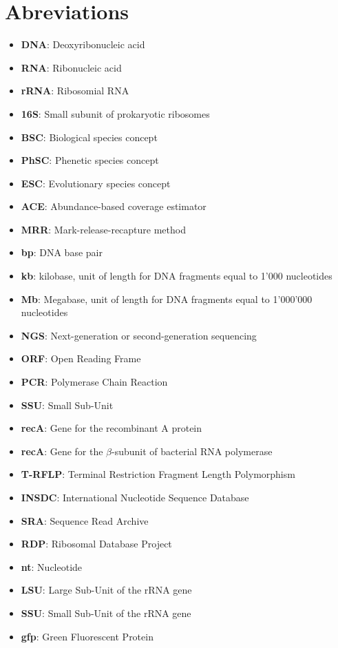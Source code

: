 \logvartrue
\chapter{Abreviations}

\begin{itemize}
\item \textbf{DNA}: Deoxyribonucleic acid
\item \textbf{RNA}: Ribonucleic acid
\item \textbf{rRNA}: Ribosomial RNA
\item \textbf{16S}: Small subunit of prokaryotic ribosomes
\item \textbf{BSC}: Biological species concept
\item \textbf{PhSC}: Phenetic species concept
\item \textbf{ESC}: Evolutionary species concept
\item \textbf{ACE}: Abundance-based coverage estimator
\item \textbf{MRR}: Mark-release-recapture method
\item \textbf{bp}: DNA base pair
\item \textbf{kb}: kilobase, unit of length for DNA fragments equal to 1'000 nucleotides
\item \textbf{Mb}: Megabase, unit of length for DNA fragments equal to 1'000'000 nucleotides
\item \textbf{NGS}: Next-generation or second-generation sequencing
\item \textbf{ORF}: Open Reading Frame
\item \textbf{PCR}: Polymerase Chain Reaction
\item \textbf{SSU}: Small Sub-Unit
\item \textbf{recA}: Gene for the recombinant A protein
\item \textbf{recA}: Gene for the $\beta$-subunit of bacterial RNA polymerase
\item \textbf{T-RFLP}: Terminal Restriction Fragment Length Polymorphism
\item \textbf{INSDC}: International Nucleotide Sequence Database
\item \textbf{SRA}: Sequence Read Archive
\item \textbf{RDP}: Ribosomal Database Project
\item \textbf{nt}: Nucleotide
\item \textbf{LSU}: Large Sub-Unit of the rRNA gene
\item \textbf{SSU}: Small Sub-Unit of the rRNA gene
\item \textbf{gfp}: Green Fluorescent Protein


\end{itemize}
